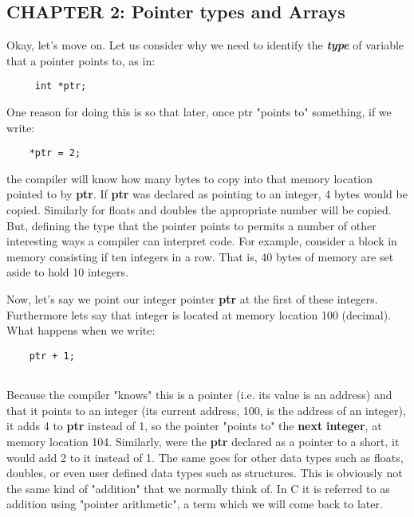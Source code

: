 \hypertarget{chapter-2-pointer-types-and-arrays}{%
\subsection{CHAPTER 2: Pointer types and
Arrays}\label{chapter-2-pointer-types-and-arrays}}

Okay, let's move on. Let us consider why we need to identify the
\emph{\textbf{type}} of variable that a pointer points to, as in:

\begin{verbatim}
     int *ptr;
\end{verbatim}

One reason for doing this is so that later, once ptr "points to"
something, if we write:

\begin{verbatim}
    *ptr = 2;
\end{verbatim}

the compiler will know how many bytes to copy into that memory location
pointed to by \textbf{ptr}. If \textbf{ptr} was declared as pointing to
an integer, 4 bytes would be copied. Similarly for floats and
doubles the appropriate number will be copied. But, defining the type
that the pointer points to permits a number of other interesting ways a
compiler can interpret code. For example, consider a block in memory
consisting if ten integers in a row. That is, 40 bytes of memory are set
aside to hold 10 integers.

Now, let's say we point our integer pointer \textbf{ptr} at the first of
these integers. Furthermore lets say that integer is located at memory
location 100 (decimal). What happens when we write:

\begin{verbatim}
    ptr + 1;
 
\end{verbatim}

Because the compiler "knows" this is a pointer (i.e. its value is an
address) and that it points to an integer (its current address, 100, is
the address of an integer), it adds 4 to \textbf{ptr} instead of 1, so
the pointer "points to" the \textbf{next} \textbf{integer}, at memory
location 104. Similarly, were the \textbf{ptr} declared as a pointer to
a short, it would add 2 to it instead of 1. The same goes for other data
types such as floats, doubles, or even user defined data types such as
structures. This is obviously not the same kind of "addition" that we
normally think of. In C it is referred to as addition using "pointer
arithmetic", a term which we will come back to later.

